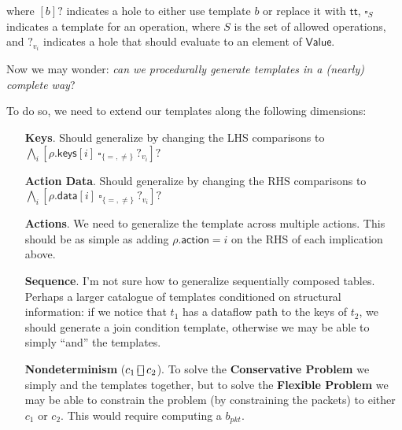\documentclass{article}
\newcommand{\TRUE}{\mathsf{tt}}
\newcommand{\Value}{\mathsf{Value}}
\newcommand{\action}{\mathsf{action}}
\newcommand{\keys}{\mathsf{keys}}
\newcommand{\data}{\mathsf{data}}
\newcommand{\choiceop}{\rotatebox[origin=c]{90}{$\sqsubset\!\!\!\sqsupset$}}
\newcommand{\choice}{\mathbin{\choiceop}}
\begin{document}
where $[b]?$ indicates a hole to either use template $b$ or replace it with
$\TRUE$, $\square_S$ indicates a template for an operation, where $S$ is the set
of allowed operations, and $?_{v_i}$ indicates a hole that should evaluate to an element
of $\Value$.

Now we may wonder: \emph{can we procedurally generate templates in a (nearly) complete way}?

To do so, we need to extend our templates along the following dimensions:
\begin{enumerate}[align=left]
\item[\textbf{Keys}.] Should generalize by changing the LHS comparisons to $
  \bigwedge_i[\rho.\keys[i]~\square_{\{=,\neq\}}~?_{v_i}]?$
\item[\textbf{Action Data}.] Should generalize by changing the RHS comparisons to $\bigwedge_i[\rho.\data[i]~\square_{\{=,\neq\}}~?_{v_i}]?$
\item[\textbf{Actions}.] We need to generalize the template across multiple actions. This should be as simple as adding $\rho.\action = i$ on the RHS of each implication above.
\item[\textbf{Sequence}.] I'm not sure how to generalize sequentially composed tables.
  Perhaps a larger catalogue of templates conditioned on structural information:
  if we notice that $t_1$ has a dataflow path to the keys of $t_2$, we should
  generate a join condition template, otherwise we may be able to simply ``and'' the templates.

\item[\textbf{Nondeterminism} ($c_1 \choice c_2$).] To solve the \textbf{Conservative
  Problem} we simply and the templates together, but to solve the
  \textbf{Flexible Problem} we may be able to constrain the problem (by
  constraining the packets) to either $c_1$ or $c_2$. This would require
  computing a $b_{\textit{pkt}}$.
\end{enumerate}
\end{document}
